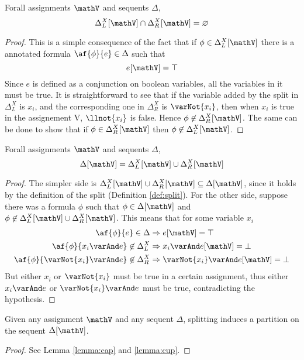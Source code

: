 \begin{lemma}
	\label{lemma:cap}
	Forall assignments $\mathV$ and sequents $\Delta$,
	$$ \Delta_L^X[\mathV] \cap \Delta_R^X[\mathV] = \varnothing $$
\end{lemma}
\begin{proof}
	This is a simple consequence of the fact that if $\phi \in \Delta_L^X[\mathV]$ there is a annotated formula $\af{\phi}{e} \in \Delta$ such that 
	$$ e[\mathV] = \top $$
	Since $e$ is defined as a conjunction on boolean variables, all the variables in it must be true.
	It is straightforward to see that if the variable added by the split in $\Delta_L^X$ is $x_i$, and the corresponding one in $\Delta_R^X$ is $\varNot{x_i}$, then when $x_i$ is true in the assignement V, $\llnot{x_i}$ is false.
	Hence $\phi \not \in \Delta_R^X[\mathV]$.
	The same can be done to show that if $\phi \in \Delta_R^X[\mathV]$ then $\phi \not \in \Delta_L^X[\mathV]$.
\end{proof}
\begin{lemma}
	\label{lemma:cup}
	Forall assignments $\mathV$ and sequents $\Delta$,
	$$ \Delta[\mathV] = \Delta_L^X[\mathV] \cup \Delta_R^X[\mathV] $$
\end{lemma}
\begin{proof}
	The simpler side is $\Delta_L^X[\mathV] \cup \Delta_R^X[\mathV] \subseteq \Delta[\mathV]$, since it  holds by the definition of the split (Definition \ref{def:split}).
	For the other side, suppose there was a formula $\phi$ such that $\phi \in \Delta[\mathV]$ and $\phi \not \in \Delta_L^X[\mathV] \cup \Delta_R^X[\mathV]$.
	This means that for some variable $x_i$ 
	\begin{align*}
		\af{\phi}{e} \in \Delta &\Rightarrow e[\mathV] = \top \\
		\af{\phi}{x_i \varAnd e} \not \in \Delta_L^X &\Rightarrow x_i \varAnd e[\mathV] = \bot \\
		\af{\phi}{\varNot{x_i} \varAnd e} \not \in \Delta_R^X &\Rightarrow \varNot{x_i} \varAnd e[\mathV] = \bot
	\end{align*}
	But either $x_i$ or $\varNot{x_i}$ must be true in a certain assignment, thus either $x_i \varAnd e$ or $\varNot{x_i} \varAnd e$ must be true, contradicting the hypothesis.
\end{proof}
\begin{lemma}
	Given any assignment $\mathV$ and any sequent $\Delta$, splitting induces a partition on the sequent $\Delta[\mathV]$.
\end{lemma}
\begin{proof}
	See Lemma \ref{lemma:cap} and \ref{lemma:cup}.
\end{proof}

